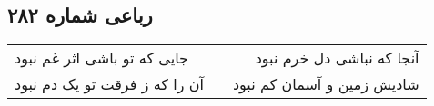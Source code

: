 \begin{center}
\section*{رباعی شماره ۲۸۲}
\label{sec:sh282}
\begin{longtable}{l p{0.5cm} r}
جایی که تو باشی اثر غم نبود
&&
آنجا که نباشی دل خرم نبود
\\
آن را که ز فرقت تو یک دم نبود
&&
شادیش زمین و آسمان کم نبود
\\
\end{longtable}
\end{center}
